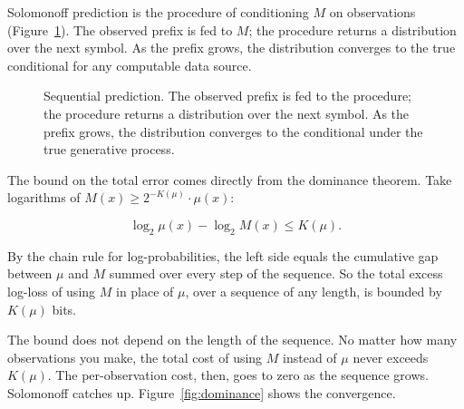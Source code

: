 Solomonoff prediction is the procedure of conditioning $M$ on observations (Figure~\ref{fig:sequential-prediction}). The observed prefix is fed to $M$; the procedure returns a distribution over the next symbol. As the prefix grows, the distribution converges to the true conditional for any computable data source.

\begin{figure}[h]
\centering
{}
\caption{Sequential prediction. The observed prefix is fed to the procedure; the procedure returns a distribution over the next symbol. As the prefix grows, the distribution converges to the conditional under the true generative process.}
\label{fig:sequential-prediction}
\end{figure}

The bound on the total error comes directly from the dominance theorem. Take logarithms of $M(x) \geq 2^{-K(\mu)} \cdot \mu(x)$:

$$\log_2 \mu(x) - \log_2 M(x) \leq K(\mu).$$

By the chain rule for log-probabilities, the left side equals the cumulative gap between $\mu$ and $M$ summed over every step of the sequence. So the total excess log-loss of using $M$ in place of $\mu$, over a sequence of any length, is bounded by $K(\mu)$ bits.

The bound does not depend on the length of the sequence. No matter how many observations you make, the total cost of using $M$ instead of $\mu$ never exceeds $K(\mu)$. The per-observation cost, then, goes to zero as the sequence grows. Solomonoff catches up. Figure~\ref{fig:dominance} shows the convergence.

